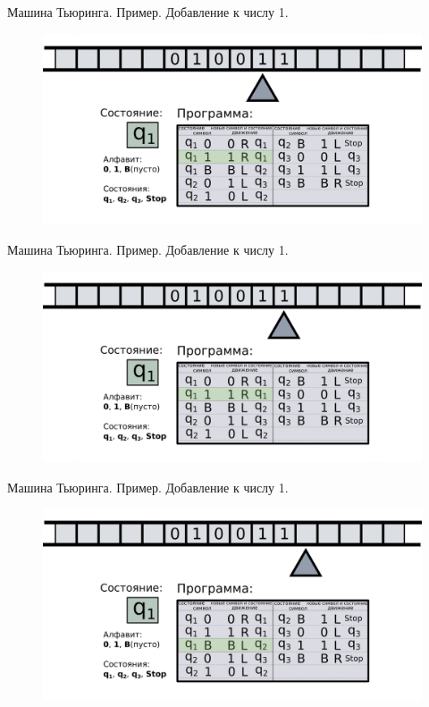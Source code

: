 \documentclass[10pt]{beamer}
\begin{document}
\begin{frame}{Машина Тьюринга. Пример. Добавление к числу 1.}
	\begin{figure}
		\centerline{\includegraphics[width=1.5\linewidth]{images/tm_ex_6.png}}
	\end{figure}
\end{frame}

\begin{frame}{Машина Тьюринга. Пример. Добавление к числу 1.}
	\begin{figure}
		\centerline{\includegraphics[width=1.5\linewidth]{images/tm_ex_7.png}}
	\end{figure}
\end{frame}

\begin{frame}{Машина Тьюринга. Пример. Добавление к числу 1.}
	\begin{figure}
		\centerline{\includegraphics[width=1.5\linewidth]{images/tm_ex_8.png}}
	\end{figure}
\end{frame}
\end{document}
